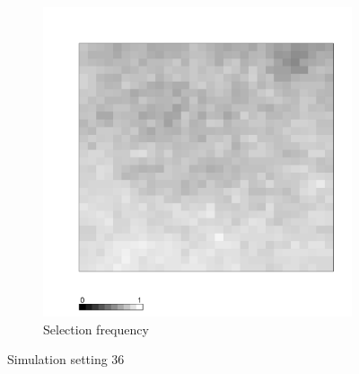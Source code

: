 \documentclass[authoryear, review, 11pt]{elsarticle}
\begin{document}
\begin{figure}
	\begin{subfigure}[b]{0.45\textwidth}
	\centering
		\includegraphics[width=\textwidth]{../../figures/simulation/X1.15.36.selection.pdf}
		\caption{Selection frequency}
	\end{subfigure}
	\caption{Simulation setting 36}
\end{figure}
\end{document}
